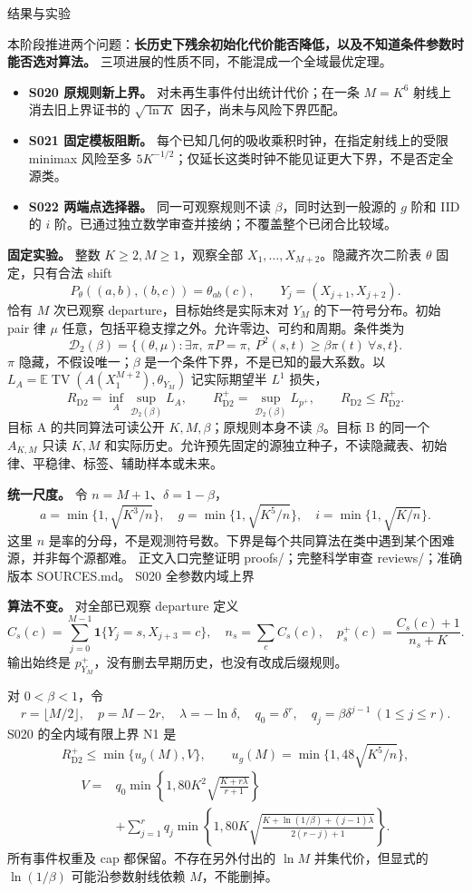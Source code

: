 \documentclass[11pt,a4paper]{article}
\newcommand{\TV}{\operatorname{TV}}\newcommand{\E}{\mathbb E}\newcommand{\R}{R_{\mathrm{D2}}}\newcommand{\Rp}{R_{\mathrm{D2}}^+}
\newcommand{\head}[2]{{\small\sffamily #1}\par\vspace{2pt}{\LARGE\bfseries #2}\par\vspace{5pt}}
\newcommand{\entry}[1]{\vfill\noindent\small 正文入口\quad #1\normalsize}
\begin{document}
\head{结果与实验}{长历史弱混合与未知条件的阶段结果}
本阶段推进两个问题：\textbf{长历史下残余初始化代价能否降低，以及不知道条件参数时能否选对算法。} 三项进展的性质不同，不能混成一个全域最优定理。
\begin{itemize}
\item \textbf{S020 原规则新上界。} 对未再生事件付出统计代价；在一条 $M=K^6$ 射线上消去旧上界证书的 $\sqrt{\ln K}$ 因子，尚未与风险下界匹配。
\item \textbf{S021 固定模板阻断。} 每个已知几何的吸收乘积时钟，在指定射线上的受限 minimax 风险至多 $5K^{-1/2}$；仅延长这类时钟不能见证更大下界，不是否定全源类。
\item \textbf{S022 两端点选择器。} 同一可观察规则不读 $\beta$，同时达到一般源的 $g$ 阶和 IID 的 $i$ 阶。已通过独立数学审查并接纳；不覆盖整个已闭合比较域。
\end{itemize}
\textbf{固定实验。} 整数 $K\ge2,M\ge1$，观察全部 $X_1,\ldots,X_{M+2}$。隐藏齐次二阶表 $\theta$ 固定，只有合法 shift
\[
P_\theta((a,b),(b,c))=\theta_{ab}(c),\qquad Y_j=(X_{j+1},X_{j+2}).
\]
恰有 $M$ 次已观察 departure，目标始终是实际末对 $Y_M$ 的下一符号分布。初始 pair 律 $\mu$ 任意，包括平稳支撑之外。允许零边、可约和周期。条件类为
\[
\mathcal D_2(\beta)=\{(\theta,\mu):\exists\pi,\ \pi P=\pi,\ P^2(s,t)\ge\beta\pi(t)\ \forall s,t\}.
\]
$\pi$ 隐藏，不假设唯一；$\beta$ 是一个条件下界，不是已知的最大系数。以 $L_A=\E\TV(A(X_1^{M+2}),\theta_{Y_M})$ 记实际期望半 $L^1$ 损失，
\[
\R=\inf_A\sup_{\mathcal D_2(\beta)}L_A,\qquad
\Rp=\sup_{\mathcal D_2(\beta)}L_{p^+},\qquad \R\le\Rp.
\]
目标 A 的共同算法可读公开 $K,M,\beta$；原规则本身不读 $\beta$。目标 B 的同一个 $A_{K,M}$ 只读 $K,M$ 和实际历史。允许预先固定的源独立种子，不读隐藏表、初始律、平稳律、标签、辅助样本或未来。

\textbf{统一尺度。} 令 $n=M+1$、$\delta=1-\beta$，
\[
a=\min\{1,\sqrt{K^3/n}\},\quad g=\min\{1,\sqrt{K^5/n}\},\quad i=\min\{1,\sqrt{K/n}\}.
\]
这里 $n$ 是率的分母，不是观测符号数。下界是每个共同算法在类中遇到某个困难源，并非每个源都难。
\entry{完整证明 proofs/；完整科学审查 reviews/；准确版本 SOURCES.md。}
\newpage
\head{S020 全参数内域上界}{不把未再生当作完全没有信息}
\textbf{算法不变。} 对全部已观察 departure 定义
\[
C_s(c)=\sum_{j=0}^{M-1}\mathbf1\{Y_j=s,X_{j+3}=c\},\quad n_s=\sum_c C_s(c),\quad
p_s^+(c)=\frac{C_s(c)+1}{n_s+K}.
\]
输出始终是 $p^+_{Y_M}$，没有删去早期历史，也没有改成后缀规则。

对 $0<\beta<1$，令
\[
r=\lfloor M/2\rfloor,\quad p=M-2r,\quad \lambda=-\ln\delta,\quad
q_0=\delta^r,\quad q_j=\beta\delta^{j-1}\ (1\le j\le r).
\]
S020 的全内域有限上界 N1 是
\[
\Rp\le\min\{u_g(M),V\},\qquad u_g(M)=\min\{1,48\sqrt{K^5/n}\},
\]
\begin{align*}
V={}&q_0\min\left\{1,80K^2\sqrt{\frac{K+r\lambda}{r+1}}\right\}\\
&+\sum_{j=1}^{r}q_j\min\left\{1,80K\sqrt{\frac{K+\ln(1/\beta)+(j-1)\lambda}{2(r-j)+1}}\right\}.
\end{align*}
所有事件权重及 cap 都保留。不存在另外付出的 $\ln M$ 并集代价，但显式的 $\ln(1/\beta)$ 可能沿参数射线依赖 $M$，不能删掉。
\end{document}
